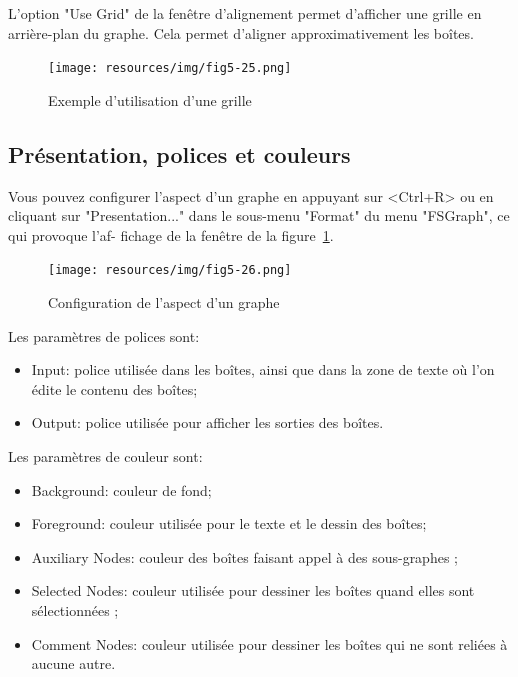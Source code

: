 \bigskip
\noindent L’option "Use Grid" de la fenêtre d’alignement permet d’afficher une grille en
arrière-plan du graphe. Cela permet d’aligner approximativement les boîtes.

\bigskip
\begin{figure}[!ht]
\begin{center}
\texttt{[image: resources/img/fig5-25.png]}
\caption{Exemple d’utilisation d’une grille}
\end{center}
\end{figure}

\subsection{Présentation, polices et couleurs}
\label{section-display-fonts-colors}
Vous pouvez configurer l’aspect d’un graphe en appuyant sur <Ctrl+R> ou en cliquant
sur "Presentation..." dans le sous-menu "Format" du menu "FSGraph", ce qui provoque l’af-
fichage de la fenêtre de la figure~\ref{fig-graph-display-configuration}.

\begin{figure}[!ht]
\begin{center}
\texttt{[image: resources/img/fig5-26.png]}
\caption{Configuration de l’aspect d’un graphe\label{fig-graph-display-configuration}}
\end{center}
\end{figure}

\bigskip
\noindent Les paramètres de polices sont:
\begin{itemize}
  \item Input: police utilisée dans les boîtes, ainsi que dans la zone de texte où l’on édite le
contenu des boîtes;
\item Output: police utilisée pour afficher les sorties des boîtes.
\end{itemize}

\bigskip
\noindent Les paramètres de couleur sont:
\begin{itemize}
  \item Background: couleur de fond;
  \item Foreground: couleur utilisée pour le texte et le dessin des boîtes;
  \item Auxiliary Nodes: couleur des boîtes faisant appel à des sous-graphes ;
  \item Selected Nodes: couleur utilisée pour dessiner les boîtes quand elles sont sélectionnées ;
  \item Comment Nodes: couleur utilisée pour dessiner les boîtes qui ne sont reliées à aucune autre.
\end{itemize}

